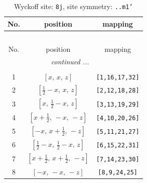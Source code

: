\documentclass[fleqn,8pt]{jsarticle}
\begin{document}
\begin{longtable}{ccc}
\caption{Wyckoff site: {\tt 8j}, site symmetry: {\tt ..m1'}}
 \\
 \hline \hline
No. & position & mapping \\ \hline \endfirsthead

\multicolumn{2}{l}{\tablename\ \thetable{}} \\
 \hline \hline
No. & position & mapping \\ \hline \endhead

 \hline \hline
\multicolumn{2}{r}{\footnotesize\it continued ...} \\ \endfoot

 \hline \hline
\multicolumn{2}{r}{} \\ \endlastfoot

1 & $\left[ x,\, x,\, z \right]$ & {\tt [1,16,17,32]} \\ \hline
2 & $\left[ \frac{1}{2} - x,\, x,\, z \right]$ & {\tt [2,12,18,28]} \\ \hline
3 & $\left[ x,\, \frac{1}{2} - x,\, z \right]$ & {\tt [3,13,19,29]} \\ \hline
4 & $\left[ x + \frac{1}{2},\, - x,\, - z \right]$ & {\tt [4,10,20,26]} \\ \hline
5 & $\left[ - x,\, x + \frac{1}{2},\, - z \right]$ & {\tt [5,11,21,27]} \\ \hline
6 & $\left[ \frac{1}{2} - x,\, \frac{1}{2} - x,\, z \right]$ & {\tt [6,15,22,31]} \\ \hline
7 & $\left[ x + \frac{1}{2},\, x + \frac{1}{2},\, - z \right]$ & {\tt [7,14,23,30]} \\ \hline
8 & $\left[ - x,\, - x,\, - z \right]$ & {\tt [8,9,24,25]} \\
\end{longtable}
\renewcommand{\arraystretch}{1.2}
\end{document}
